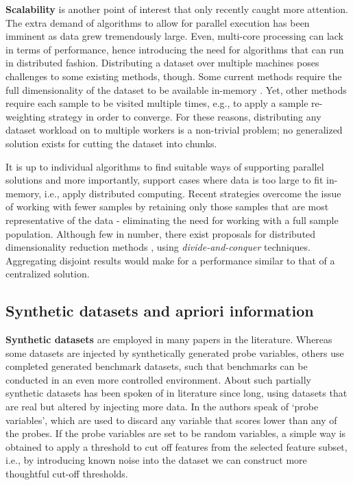 \documentclass[../main.tex]{subfiles}
\begin{document}
\textbf{Scalability} is another point of interest that only recently caught more attention. The extra demand of algorithms to allow for parallel execution has been imminent as data grew tremendously large. Even, multi-core processing can lack in terms of performance, hence introducing the need for algorithms that can run in distributed fashion. Distributing a dataset over multiple machines poses challenges to some existing methods, though. Some current methods require the full dimensionality of the dataset to be available in-memory \citep{tang_feature_2014}. Yet, other methods require each sample to be visited multiple times, e.g., to apply a sample re-weighting strategy in order to converge. For these reasons, distributing any dataset workload on to multiple workers is a non-trivial problem; no generalized solution exists for cutting the dataset into chunks.

It is up to individual algorithms to find suitable ways of supporting parallel solutions and more importantly, support cases where data is too large to fit in-memory, i.e., apply distributed computing. Recent strategies overcome the issue of working with fewer samples by retaining only those samples that are most representative of the data - eliminating the need for working with a full sample population. Although few in number, there exist proposals for distributed dimensionality reduction methods \citep{li_distributed_2020}, using \textit{divide-and-conquer} techniques. Aggregating disjoint results would make for a performance similar to that of a centralized solution.




\subsection{Synthetic datasets and apriori information}
\textbf{Synthetic datasets} are employed in many papers in the literature. Whereas some datasets are injected by synthetically generated probe variables, others use completed generated benchmark datasets, such that benchmarks can be conducted in an even more controlled environment.
About such partially synthetic datasets has been spoken of in literature since long, using datasets that are real but altered by injecting more data. In \citep{guyon_introduction_2003} the authors speak of \lq probe variables', which are used to discard any variable that scores lower than any of the probes. If the probe variables are set to be random variables, a simple way is obtained to apply a threshold to cut off features from the selected feature subset, i.e., by introducing known noise into the dataset we can construct more thoughtful cut-off thresholds.
\end{document}
